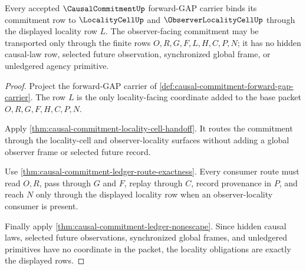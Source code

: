 \begin{theorem}
\label{thm:causal-commitment-locality-obligations}
Every accepted $\CausalCommitmentUp$ forward-GAP carrier binds its commitment row to $\LocalityCellUp$ and $\ObserverLocalityCellUp$ through the displayed locality row $L$. The observer-facing commitment may be transported only through the finite rows $O,R,G,F,L,H,C,P,N$; it has no hidden causal-law row, selected future observation, synchronized global frame, or unledgered agency primitive.
\end{theorem}
\begin{proof}
Project the forward-GAP carrier of \autoref{def:causal-commitment-forward-gap-carrier}. The row $L$ is the only locality-facing coordinate added to the base packet $O,R,G,F,H,C,P,N$.

Apply \autoref{thm:causal-commitment-locality-cell-handoff}. It routes the commitment through the locality-cell and observer-locality surfaces without adding a global observer frame or selected future record.

Use \autoref{thm:causal-commitment-ledger-route-exactness}. Every consumer route must read $O,R$, pass through $G$ and $F$, replay through $C$, record provenance in $P$, and reach $N$ only through the displayed locality row when an observer-locality consumer is present.

Finally apply \autoref{thm:causal-commitment-ledger-nonescape}. Since hidden causal laws, selected future observations, synchronized global frames, and unledgered primitives have no coordinate in the packet, the locality obligations are exactly the displayed rows.
\end{proof}

